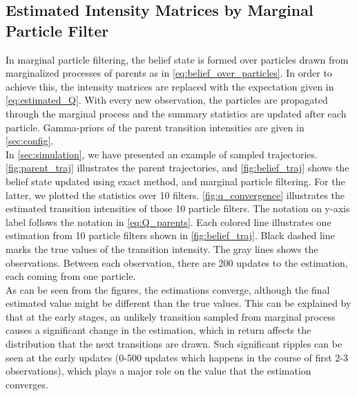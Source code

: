 \subsection{Estimated Intensity Matrices by Marginal Particle Filter}
In marginal particle filtering, the belief state is formed over particles drawn from marginalized processes of parents as in \autoref{eq:belief_over_particles}. In order to achieve this, the intensity matrices are replaced with the expectation given in \autoref{eq:estimated_Q}. With every new observation, the particles are propagated through the marginal process and the summary statistics are updated after each particle. Gamma-priors of the parent transition intensities are given in \cref{sec:config}. \\
In \cref{sec:simulation}, we have presented an example of sampled trajectories. \autoref{fig:parent_traj} illustrates the parent trajectories, and \autoref{fig:belief_traj} shows the belief state updated using exact method, and marginal particle filtering. For the latter, we plotted the statistics over 10 filters. \autoref{fig:q_convergence} illustrates the estimated transition intensities of those 10 particle filters. The notation on y-axis label follows the notation in \autoref{eq:Q_parents}. Each colored line illustrates one estimation from 10 particle filters shown in \autoref{fig:belief_traj}. Black dashed line marks the true values of the transition intensity. The gray lines shows the observations. Between each observation, there are 200 updates to the estimation, each coming from one particle. \\
As can be seen from the figures, the estimations converge, although the final estimated value might be different than the true values. This can be explained by that at the early stages, an unlikely transition sampled from marginal process causes a significant change in the estimation, which in return affects the distribution that the next transitions are drawn. Such significant ripples can be seen at the early updates (0-500 updates which happens in the course of first 2-3 observations), which plays a major role on the value that the estimation converges.
